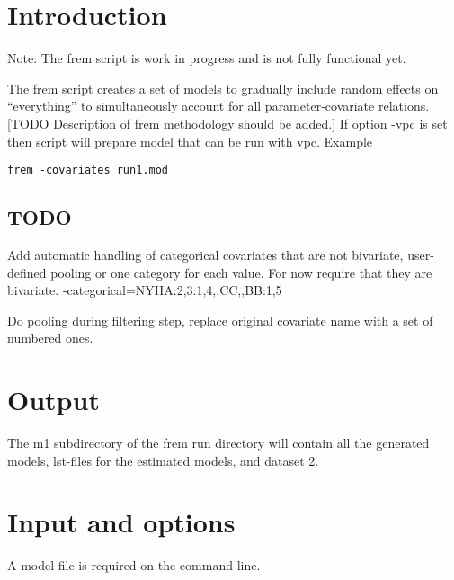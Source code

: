 



\maketitle


\section{Introduction}
Note: The frem script is work in progress and is not fully functional yet.

The frem script creates a set of models to gradually include random effects on “everything” to simultaneously account for all parameter-covariate relations. [TODO Description of frem methodology should be added.] If option -vpc is set then script will prepare model that can be run with vpc.
Example
\begin{verbatim}
frem -covariates run1.mod
\end{verbatim}

\subsection{TODO}
Add automatic handling of categorical covariates that are not bivariate, user-defined pooling or one category for each value. For now require that they are bivariate.
 -categorical=NYHA:2,3:1,4,,CC,,BB:1,5

Do pooling during filtering step, replace original covariate name with a set of numbered ones. 


\section{Output}
The m1 subdirectory of the frem run directory will contain all the generated models, lst-files for the estimated models, and dataset 2.

\section{Input and options}
A model file is required on the command-line.

